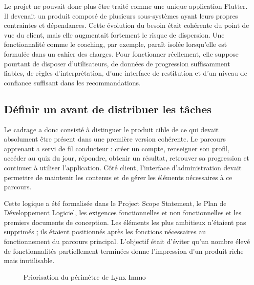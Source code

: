 Le projet ne pouvait donc plus être traité comme une unique application Flutter. Il devenait un produit composé de plusieurs sous-systèmes ayant leurs propres contraintes et dépendances. Cette évolution du besoin était cohérente du point de vue du client, mais elle augmentait fortement le risque de dispersion. Une fonctionnalité comme le coaching, par exemple, paraît isolée lorsqu'elle est formulée dans un cahier des charges. Pour fonctionner réellement, elle suppose pourtant de disposer d'utilisateurs, de données de progression suffisamment fiables, de règles d'interprétation, d'une interface de restitution et d'un niveau de confiance suffisant dans les recommandations.

\subsection{Définir un  avant de distribuer les tâches}

Le cadrage a donc consisté à distinguer le produit cible de ce qui devait absolument être présent dans une première version cohérente. Le parcours apprenant a servi de fil conducteur : créer un compte, renseigner son profil, accéder au quiz du jour, répondre, obtenir un résultat, retrouver sa progression et continuer à utiliser l'application. Côté client, l'interface d'administration devait permettre de maintenir les contenus et de gérer les éléments nécessaires à ce parcours.

Cette logique a été formalisée dans le Project Scope Statement, le Plan de Développement Logiciel, les exigences fonctionnelles et non fonctionnelles et les premiers documents de conception. Les éléments les plus ambitieux n'étaient pas supprimés ; ils étaient positionnés après les fonctions nécessaires au fonctionnement du parcours principal. L'objectif était d'éviter qu'un nombre élevé de fonctionnalités partiellement terminées donne l'impression d'un produit riche mais inutilisable.

\begin{figure}[H]
\centering
{}
\caption{Priorisation du périmètre de Lynx Immo}
\label{fig:lynx-priorisation}
\end{figure}

